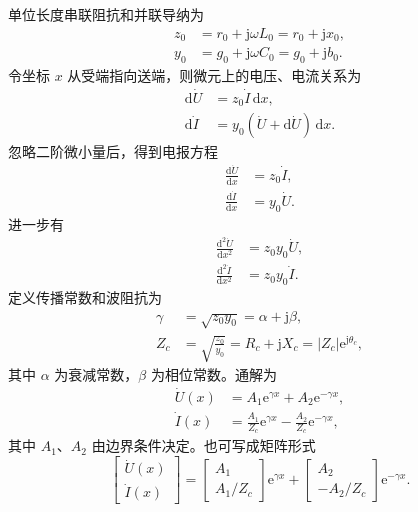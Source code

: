 \documentclass[
  12pt,
  UTF8,
  a4paper,
  fontset=fandol,
  oneside,
  openany
]{ctexrep}
\begin{document}
单位长度串联阻抗和并联导纳为
\begin{align}
  z_0 & =r_0+\mathrm{j}\omega L_0=r_0+\mathrm{j}x_0, \\
  y_0 & =g_0+\mathrm{j}\omega C_0=g_0+\mathrm{j}b_0.
\end{align}
令坐标 $x$ 从受端指向送端，则微元上的电压、电流关系为
\begin{align}
  \mathrm{d}\dot U & =z_0\dot I\,\mathrm{d}x,                    \\
  \mathrm{d}\dot I & =y_0(\dot U+\mathrm{d}\dot U)\,\mathrm{d}x.
\end{align}
忽略二阶微小量后，得到电报方程
\begin{align}
  \frac{\mathrm{d}\dot U}{\mathrm{d}x} & =z_0\dot I, \\
  \frac{\mathrm{d}\dot I}{\mathrm{d}x} & =y_0\dot U.
\end{align}
进一步有
\begin{align}
  \frac{\mathrm{d}^2\dot U}{\mathrm{d}x^2} & =z_0y_0\dot U, \\
  \frac{\mathrm{d}^2\dot I}{\mathrm{d}x^2} & =z_0y_0\dot I.
\end{align}
定义传播常数和波阻抗为
\begin{align}
  \gamma & =\sqrt{z_0y_0}=\alpha+\mathrm{j}\beta, \\
  Z_c    & =\sqrt{\frac{z_0}{y_0}}
  =R_c+\mathrm{j}X_c
  =\lvert Z_c\rvert\mathrm{e}^{\mathrm{j}\theta_c},
\end{align}
其中 $\alpha$ 为衰减常数，$\beta$ 为相位常数。通解为
\begin{align}
  \dot U(x) & =A_1\mathrm{e}^{\gamma x}+A_2\mathrm{e}^{-\gamma x}, \\
  \dot I(x) & =\frac{A_1}{Z_c}\mathrm{e}^{\gamma x}
  -\frac{A_2}{Z_c}\mathrm{e}^{-\gamma x},
\end{align}
其中 $A_1$、$A_2$ 由边界条件决定。也可写成矩阵形式
\begin{equation}
  \begin{bmatrix}
    \dot U(x) \\[2pt]
    \dot I(x)
  \end{bmatrix}
  =
  \begin{bmatrix}
    A_1 \\[2pt]
    A_1/Z_c
  \end{bmatrix}
  \mathrm{e}^{\gamma x}
  +
  \begin{bmatrix}
    A_2 \\[2pt]
    -A_2/Z_c
  \end{bmatrix}
  \mathrm{e}^{-\gamma x}.
\end{equation}
\end{document}
